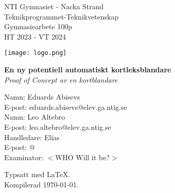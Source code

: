 \begin{titlepage}
	\begin{minipage}[t]{0.45\textwidth}
		\raggedright
		NTI Gymnasiet - Nacka Strand \\
		Teknikprogrammet-Teknikvetenskap \\
		Gymnasiearbete 100p \\
		HT 2023 - VT 2024
	\end{minipage}
	\begin{minipage}[t]{0.5\textwidth}
		\raggedleft
		\begin{adjustbox}{valign=t}
			\texttt{[image: logo.png]}
		\end{adjustbox}
	\end{minipage}

	\vspace*{\fill} %

	\begin{center}
		\Large\textbf{En ny potentiell automatiskt kortleksblandare}\\
		\large\textit{Proof of Concept av en kortblandare}
	\end{center}

	\vspace*{\fill} %

	\begin{minipage}[b]{0.45\textwidth}
		\raggedright
		Namn: Eduards Abisevs\\
		E-post: eduards.abisevs@elev.ga.ntig.se\\
		Namn: Leo Altebro\\
		E-post: leo.altebro@elev.ga.ntig.se\\
		Handledare: Elias \\ 
		E-post: @ \\
		Examinator: \(<\)WHO Will it be?\(>\)
	\end{minipage}
	\begin{minipage}[b]{0.5\textwidth}
		\raggedleft
		Typsatt med \LaTeX. \\
		Kompilerad \today.
	\end{minipage}
\end{titlepage}
